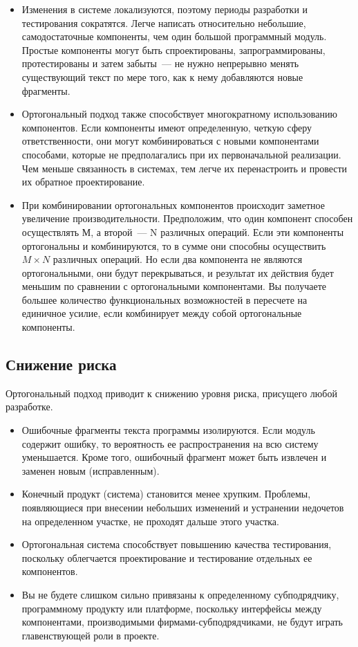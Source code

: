 \begin{itemize}
\item Изменения в системе локализуются, поэтому периоды разработки и
тестирования сократятся. Легче написать относительно небольшие, самодостаточные
компоненты, чем один большой программный модуль. Простые компоненты могут быть
спроектированы, запрограммированы, протестированы и затем забыты\ --- не нужно
непрерывно менять существующий текст по мере того, как к нему добавляются новые
фрагменты.

\item Ортогональный подход также способствует многократному использованию
компонентов. Если компоненты имеют определенную, четкую сферу ответственности,
они могут комбинироваться с новыми компонентами способами, которые не
предполагались при их первоначальной реализации. Чем меньше связанность в
системах, тем легче их перенастроить и провести их обратное проектирование.

\item При комбинировании ортогональных компонентов происходит заметное
увеличение производительности. Предположим, что один компонент способен
осуществлять М, а второй\ --- N различных операций. Если эти компоненты
ортогональны и комбинируются, то в сумме они способны осуществить $M\times N$
различных операций. Но если два компонента не являются ортогональными, они будут
перекрываться, и результат их действия будет меньшим по сравнении с
ортогональными компонентами. Вы получаете большее количество функциональных
возможностей в пересчете на единичное усилие, если комбинирует между собой
ортогональные компоненты.
\end{itemize}

\subsection{Снижение риска}

Ортогональный подход приводит к снижению уровня риска, присущего любой
разработке.

\begin{itemize}
\item Ошибочные фрагменты текста программы изолируются. Если модуль содержит
ошибку, то вероятность ее распространения на всю систему уменьшается. Кроме
того, ошибочный фрагмент может быть извлечен и заменен новым (исправленным).

\item Конечный продукт (система) становится менее хрупким. Проблемы,
появляющиеся при внесении небольших изменений и устранении недочетов на
определенном участке, не проходят дальше этого участка.

\item Ортогональная система способствует повышению качества тестирования,
поскольку облегчается проектирование и тестирование отдельных ее компонентов.

\item Вы не будете слишком сильно привязаны к определенному субподрядчику,
программному продукту или платформе, поскольку интерфейсы между компонентами,
производимыми фирмами-субподрядчиками, не будут играть главенствующей роли в
проекте.
\end{itemize}

